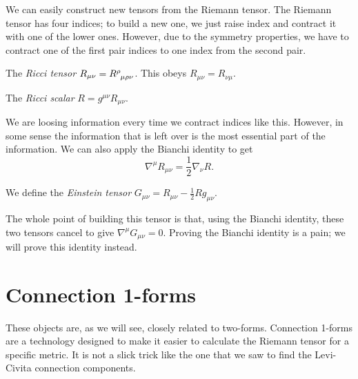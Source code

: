 We can easily construct new tensors from the Riemann tensor. The Riemann tensor has four indices; to build a new one, we just raise index and contract it with one of the lower ones.
However, due to the symmetry properties, we have to contract one of the first pair indices to one index from the second pair.
\begin{definition}[]
  The \emph{Ricci tensor} $R_{\mu\nu} = R \indices{^{\rho}_{\mu\rho\nu}}$. This obeys $R_{\mu\nu} = R_{\nu\mu}$.
\end{definition}
\begin{definition}[]
  The \emph{Ricci scalar} $R= g^{\mu\nu} R_{\mu\nu}$.
\end{definition}
We are loosing information every time we contract indices like this. However, in some sense the information that is left over is the most essential part of the information. 
We can also apply the Bianchi identity to get
\begin{equation}
  \nabla^{\mu} R_{\mu\nu} = \frac{1}{2} \nabla_{\nu} R.
\end{equation}

\begin{definition}[]
  We define the \emph{Einstein tensor} $G_{\mu\nu} = R_{\mu\nu} - \frac{1}{2} Rg_{\mu\nu}$.
\end{definition}
The whole point of building this tensor is that, using the Bianchi identity, these two tensors cancel to give $\nabla^{\mu} G_{\mu\nu} = 0$.
Proving the Bianchi identity is a pain; we will prove this identity instead.

\section{Connection 1-forms}%
\label{sec:connection_1_forms}

These objects are, as we will see, closely related to two-forms.
Connection 1-forms are a technology designed to make it easier to calculate the Riemann tensor for a specific metric. 
It is not a slick trick like the one that we saw to find the Levi-Civita connection components.


